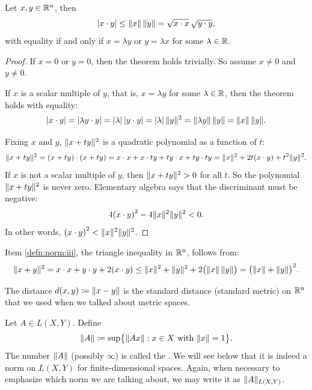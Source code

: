 \begin{thm}
Let $x, y \in {\mathbb{R}}^n$, then
\begin{equation*}
\sabs{x \cdot y} \leq \snorm{x} \, \snorm{y} = \sqrt{x\cdot x}\, \sqrt{y\cdot y},
\avoidbreak
\end{equation*}
with equality if and only if $x = \lambda y$ or $y = \lambda x$ for some
$\lambda \in {\mathbb{R}}$.
\end{thm}

\begin{proof}
If $x=0$ or $y = 0$, then the theorem holds trivially.
So assume $x\not= 0$ and $y \not= 0$.

If $x$ is a scalar multiple of $y$, that is, $x = \lambda y$ for some
$\lambda \in {\mathbb{R}}$, then the theorem holds with equality:
\begin{equation*}
\lvert { x \cdot y } \rvert =
\lvert {\lambda y \cdot y} \rvert = \lvert {\lambda} \rvert \, \lvert {y\cdot y} \rvert =
\lvert {\lambda} \rvert \, \lVert {y} \rVert^2 = \lVert {\lambda y} \rVert \, \lVert {y} \rVert
= \lVert {x} \rVert \, \lVert {y} \rVert .
\end{equation*}

Fixing $x$ and $y$,
$\lVert {x+ty} \rVert^2$
is a quadratic polynomial
as a function of $t$:
\begin{equation*}
\lVert {x+ty} \rVert^2 =
(x+ty) \cdot (x+ty) =
x \cdot x + x \cdot ty + ty \cdot x + ty \cdot ty
=
\lVert {x} \rVert^2 + 2t(x \cdot y) + t^2 \lVert {y} \rVert^2 .
\end{equation*}
If $x$ is not a scalar multiple of $y$, then 
$\lVert {x+ty} \rVert^2 > 0$ for all $t$.  So the polynomial $\lVert {x+ty} \rVert^2$
is never zero.
Elementary algebra says that the discriminant must be negative:
\begin{equation*}
4 {(x \cdot y)}^2 - 4 \lVert {x} \rVert^2\lVert {y} \rVert^2 < 0.
\end{equation*}
In other words, ${(x \cdot y)}^2 < \lVert {x} \rVert^2\lVert {y} \rVert^2$.
\end{proof}

Item \ref{defn:norm:iii}, the triangle inequality in ${\mathbb{R}}^n$,
follows from:
\begin{equation*}
\lVert {x+y} \rVert^2 
=
x \cdot x + y \cdot y + 2 (x \cdot y)
\leq
\lVert {x} \rVert^2 + \lVert {y} \rVert^2 + 2 \bigl(\lVert {x} \rVert \,\lVert {y} \rVert\bigr)
=
{\bigl(\lVert {x} \rVert + \lVert {y} \rVert\bigr)}^2 .
\end{equation*}

The distance
$d(x,y) \coloneqq \lVert {x-y} \rVert$ is the standard
distance (standard metric) on ${\mathbb{R}}^n$ that
we used when we talked about metric spaces.

\begin{defn}
Let $A \in L(X,Y)$.  Define
\begin{equation*}
\lVert {A} \rVert \coloneqq
\sup \bigl\{ \lVert {Ax} \rVert : x \in X \text{ with } \lVert {x} \rVert = 1 \bigr\} .
\end{equation*}
The number $\lVert {A} \rVert$ (possibly $\infty$)
is called the \emph{}.  We will see below
that it is indeed a norm on $L(X,Y)$ for finite-dimensional spaces.
Again, when necessary to emphasize which norm we are talking about, we may
write it as $\lVert {A} \rVert_{L(X,Y)}$.
\end{defn}

